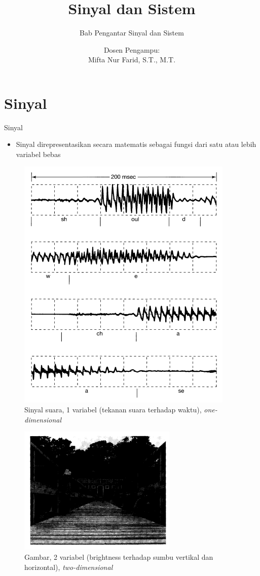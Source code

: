 \documentclass[pdflatex,compress,mathserif]{beamer}
\title{Sinyal dan Sistem}
\subtitle{Bab Pengantar Sinyal dan Sistem}
\author{Dosen Pengampu:\\Mifta Nur Farid, S.T., M.T.}
\begin{document}
\maketitle

\section{Sinyal}

\begin{frame}{Sinyal}
	\begin{itemize}
		\item Sinyal direpresentasikan secara matematis sebagai fungsi dari satu atau lebih variabel bebas
	\end{itemize}
	\begin{multicols}{2}
		\begin{figure}
			\includegraphics[width=0.5\linewidth]{img/00.sinyal_suara}
			\caption{Sinyal suara, 1 variabel (tekanan suara terhadap waktu), \textit{one-dimensional}}
		\end{figure}
		\begin{figure}
			\includegraphics[width=0.7\linewidth]{img/00.sinyal_gambar}
			\caption{Gambar, 2 variabel (brightness terhadap sumbu vertikal dan horizontal), \textit{two-dimensional}}
		\end{figure}
	\end{multicols}
\end{frame}
\end{document}
